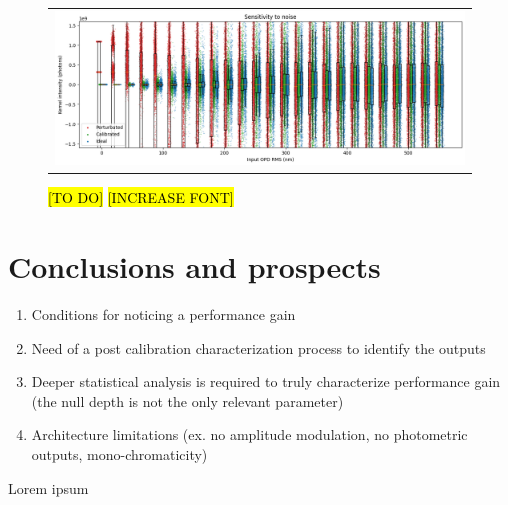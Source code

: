 \documentclass{aa}
\begin{document}
        \begin{figure}
            \begin{center}
            \begin{tabular}{c}
            \includegraphics[width=\linewidth]{img/noise_sensitivity.png}
            \end{tabular}
            \end{center}
            \caption[noise sensitivity] 
            { \label{fig:noise_sensitivity} 
            \hl{[TO DO]} \hl{[INCREASE FONT]}}
        \end{figure}
    
    
    \section{Conclusions and prospects}
    
       \begin{enumerate}
          \item Conditions for noticing a performance gain
          \item Need of a post calibration characterization process to identify the outputs
          \item Deeper statistical analysis is required to truly characterize performance gain (the null depth is not the only relevant parameter)
          \item Architecture limitations (ex. no amplitude modulation, no photometric outputs, mono-chromaticity)
       \end{enumerate}
    
    \begin{acknowledgements}
          Lorem ipsum
    \end{acknowledgements}
    
    
\end{document}
